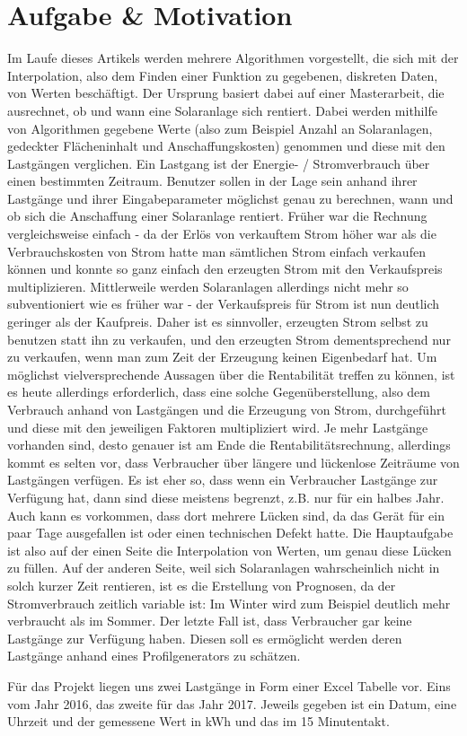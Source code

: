 
\section{Aufgabe \& Motivation}

Im Laufe dieses Artikels werden mehrere Algorithmen vorgestellt, die sich mit der Interpolation, also dem Finden einer Funktion zu gegebenen, diskreten Daten, von Werten beschäftigt. Der Ursprung basiert dabei auf einer Masterarbeit, die ausrechnet, ob und wann eine Solaranlage sich rentiert. Dabei werden mithilfe von Algorithmen gegebene Werte (also zum Beispiel Anzahl an Solaranlagen, gedeckter Flächeninhalt und Anschaffungskosten) genommen und diese mit den Lastgängen verglichen. Ein Lastgang ist der Energie- / Stromverbrauch über einen bestimmten Zeitraum. Benutzer sollen in der Lage sein anhand ihrer Lastgänge und ihrer Eingabeparameter möglichst genau zu berechnen, wann und ob sich die Anschaffung einer Solaranlage rentiert. Früher war die Rechnung vergleichsweise einfach - da der Erlös von verkauftem Strom höher war als die Verbrauchskosten von Strom hatte man sämtlichen Strom einfach verkaufen können und konnte so ganz einfach den erzeugten Strom mit den Verkaufspreis multiplizieren. Mittlerweile werden Solaranlagen allerdings nicht mehr so subventioniert wie es früher war - der Verkaufspreis für Strom ist nun deutlich geringer als der Kaufpreis. Daher ist es sinnvoller, erzeugten Strom selbst zu benutzen statt ihn zu verkaufen, und den erzeugten Strom dementsprechend nur zu verkaufen, wenn man zum Zeit der Erzeugung keinen Eigenbedarf hat. Um möglichst vielversprechende Aussagen über die Rentabilität treffen zu können, ist es heute allerdings erforderlich, dass eine solche Gegenüberstellung, also dem Verbrauch anhand von Lastgängen und die Erzeugung von Strom, durchgeführt und diese mit den jeweiligen Faktoren multipliziert wird. Je mehr Lastgänge vorhanden sind, desto genauer ist am Ende die Rentabilitätsrechnung, allerdings kommt es selten vor, dass Verbraucher über längere und lückenlose Zeiträume von Lastgängen verfügen. Es ist eher so, dass wenn ein Verbraucher Lastgänge zur Verfügung hat, dann sind diese meistens begrenzt, z.B. nur für ein halbes Jahr. Auch kann es vorkommen, dass dort mehrere Lücken sind, da das Gerät für ein paar Tage ausgefallen ist oder einen technischen Defekt hatte. Die Hauptaufgabe ist also auf der einen Seite die Interpolation von Werten, um genau diese Lücken zu füllen. Auf der anderen Seite, weil sich Solaranlagen wahrscheinlich nicht in solch kurzer Zeit rentieren, ist es die Erstellung von Prognosen, da der Stromverbrauch zeitlich variable ist: Im Winter wird zum Beispiel deutlich mehr verbraucht als im Sommer. Der letzte Fall ist, dass Verbraucher gar keine Lastgänge zur Verfügung haben. Diesen soll es ermöglicht werden deren Lastgänge anhand eines Profilgenerators zu schätzen.

Für das Projekt liegen uns zwei Lastgänge in Form einer Excel Tabelle vor. Eins vom Jahr 2016, das zweite für das Jahr 2017. Jeweils gegeben ist ein Datum, eine Uhrzeit und der gemessene Wert in kWh und das im 15 Minutentakt.